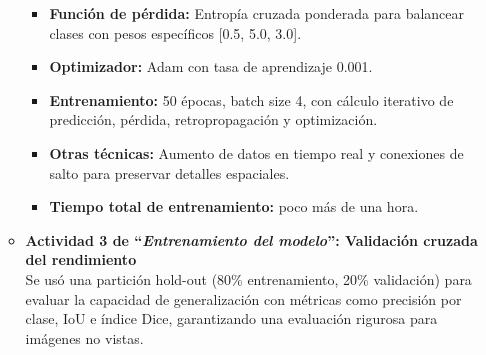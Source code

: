 \begin{enumerate}
\begin{itemize}
\begin{itemize}
\item \textbf{Función de pérdida:} Entropía cruzada ponderada para balancear clases con pesos específicos [0.5, 5.0, 3.0].

\item \textbf{Optimizador:} Adam con tasa de aprendizaje 0.001.

\item \textbf{Entrenamiento:} 50 épocas, batch size 4, con cálculo iterativo de predicción, pérdida, retropropagación y optimización.

\item \textbf{Otras técnicas:} Aumento de datos en tiempo real y conexiones de salto para preservar detalles espaciales.

\item \textbf{Tiempo total de entrenamiento:} poco más de una hora.

  \end{itemize}
  


  \item\textbf{Actividad 3 de “\textit{Entrenamiento del modelo}”: Validación cruzada del rendimiento}
\\
  Se usó una partición hold-out (80\% entrenamiento, 20\% validación) para evaluar la capacidad de generalización con métricas como precisión por clase, IoU e índice Dice, garantizando una evaluación rigurosa para imágenes no vistas.


\end{itemize}
\end{enumerate}
